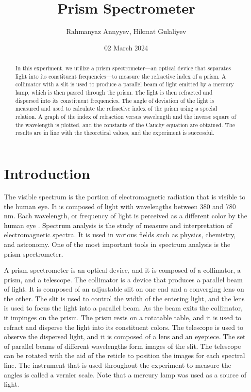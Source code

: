 \documentclass[10pt]{article}
\title{Prism Spectrometer}
\author{Rahmanyaz Annyyev, Hikmat Gulaliyev}
\date{02 March 2024}
\begin{document}
\maketitle

\begin{abstract}
In this experiment, we utilize a prism spectrometer---an optical device that separates light into its constituent frequencies---to measure the refractive index of a prism. A collimator with a slit is used to produce a parallel beam of light emitted by a mercury lamp, which is then passed through the prism. The light is then refracted and dispersed into its constituent frequencies. The angle of deviation of the light is measured and used to calculate the refractive index of the prism using a special relation. A graph of the index of refraction versus wavelength and the inverse square of the wavelength is plotted, and the constants of the Cauchy equation are obtained. The results are in line with the theoretical values, and the experiment is successful.
\end{abstract}

\section{Introduction}

The visible spectrum is the portion of electromagnetic radiation that is visible to the human eye. It is composed of light with wavelengths between 380 and 780 nm. Each wavelength, or frequency of light is perceived as a different color by the human eye \cite{Marcus_1998}. Spectrum analysis is the study of measure and interpretation of electromagnetic spectra. It is used in various fields such as physics, chemistry, and astronomy. One of the most important tools in spectrum analysis is the prism spectrometer. 

A prism spectrometer is an optical device, and it is composed of a collimator, a prism, and a telescope. The collimator is a device that produces a parallel beam of light. It is composed of an adjustable slit on one end and a converging lens on the other. The slit is used to control the width of the entering light, and the lens is used to focus the light into a parallel beam. As the beam exits the collimator, it impinges on the prism. The prism rests on a rotatable table, and it is used to refract and disperse the light into its constituent colors. The telescope is used to observe the dispersed light, and it is composed of a lens and an eyepiece. The set of parallel beams of different wavelengths form images of the slit. The telescope can be rotated with the aid of the reticle to position the images for each spectral line. 
The instrument that is used throughout the experiment to measure the angles is called a vernier scale. Note that a mercury lamp was used as a source of light.
\end{document}
